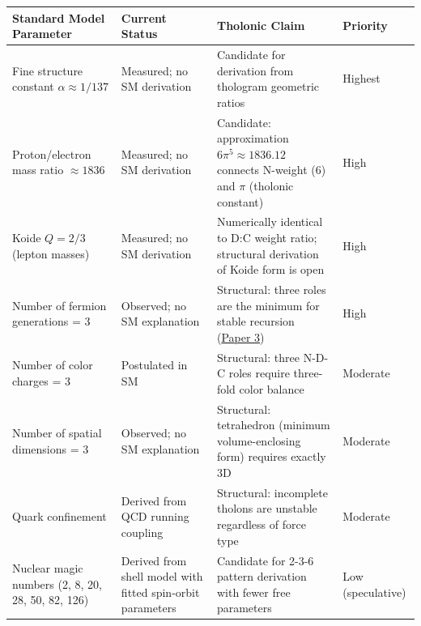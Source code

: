 \documentclass[12pt]{article}
\begin{document}
\begin{longtable}[]{@{}
  >{\raggedright\arraybackslash}p{}
  >{\raggedright\arraybackslash}p{}
  >{\raggedright\arraybackslash}p{}
  >{\raggedright\arraybackslash}p{}@{}}
\toprule\noalign{}
\begin{minipage}[b]{\linewidth}\raggedright
Standard Model Parameter
\end{minipage} & \begin{minipage}[b]{\linewidth}\raggedright
Current Status
\end{minipage} & \begin{minipage}[b]{\linewidth}\raggedright
Tholonic Claim
\end{minipage} & \begin{minipage}[b]{\linewidth}\raggedright
Priority
\end{minipage} \\
\midrule\noalign{}
\endhead
\bottomrule\noalign{}
\endlastfoot
Fine structure constant \(\alpha \approx 1/137\) & Measured; no SM
derivation & Candidate for derivation from thologram geometric ratios &
Highest \\
Proton/electron mass ratio \(\approx 1836\) & Measured; no SM derivation
& Candidate: approximation \(6\pi^5 \approx 1836.12\) connects N-weight
(6) and \(\pi\) (tholonic constant) & High \\
Koide \(Q = 2/3\) (lepton masses) & Measured; no SM derivation &
Numerically identical to D:C weight ratio; structural derivation of
Koide form is open & High \\
Number of fermion generations = 3 & Observed; no SM explanation &
Structural: three roles are the minimum for stable recursion
(\href{https://github.com/baardev/truevalue/blob/main/docnav/Research/papers/3_minimal-recursive-triadic-framework/3_minimal-recursive-triadic-framework.pdf}{Paper
3}) & High \\
Number of color charges = 3 & Postulated in SM & Structural: three N-D-C
roles require three-fold color balance & Moderate \\
Number of spatial dimensions = 3 & Observed; no SM explanation &
Structural: tetrahedron (minimum volume-enclosing form) requires exactly
3D & Moderate \\
Quark confinement & Derived from QCD running coupling & Structural:
incomplete tholons are unstable regardless of force type & Moderate \\
Nuclear magic numbers (2, 8, 20, 28, 50, 82, 126) & Derived from shell
model with fitted spin-orbit parameters & Candidate for 2-3-6 pattern
derivation with fewer free parameters & Low (speculative) \\
\end{longtable}
\end{document}
